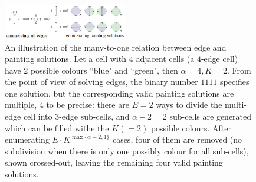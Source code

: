 \documentclass[conference]{IEEEtran}
\begin{document}
\begin{figure}[t]
\centering
\includegraphics[width = 0.48\textwidth]{figures/many_to_one_2}
\caption{An illustration of the many-to-one relation between edge and painting solutions. 
Let a cell with $4$ adjacent cells (a $4$-edge cell) have 2 possible colours ``blue" and ``green", then $\alpha = 4, K = 2$. From the point of view of solving edges, the binary number $1111$ specifies one solution, but the corresponding valid painting solutions are multiple, $4$ to be precise: there are $E=2$ ways to divide the multi-edge cell into $3$-edge sub-cells, and $\alpha-2 = 2$ sub-cells are generated which can be filled withe the $K (=2)$ possible colours. After enumerating $E\cdot K^{\max\{\alpha-2, 1\}}$ cases, four of them are removed (no subdivision when there is only one possibly colour for all sub-cells), shown crossed-out, leaving the remaining four valid painting solutions.
}
\label{fig:many_to_one}
\end{figure}
\end{document}
